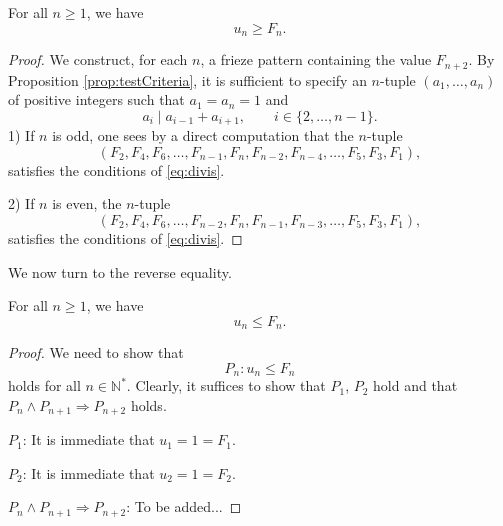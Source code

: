 \begin{lemma}
    \label{l:unLB}
    For all $n \geq 1$, we have 
    \[
        u_n \geq F_{n}.
    \]
\end{lemma}
\begin{proof}
    We construct, for each $n$, a frieze pattern containing the value $F_{n+2}$. By Proposition \ref{prop:testCriteria}, 
    it is sufficient to specify an $n$-tuple $(a_1, \ldots, a_n)$ of positive integers such that $a_1 = a_n =1$ and 
    \begin{equation}\label{eq:divis}
        a_i \mid a_{i-1} + a_{i+1}, \qquad i \in \{2, \ldots, n-1\}.
    \end{equation}
    1) If $n$ is odd, one sees by a direct computation that the $n$-tuple 
    \[
        (F_2,F_4, F_6, \ldots, F_{n-1}, F_{n}, F_{n-2}, F_{n-4}, \ldots, F_5, F_3, F_1), 
    \]
    satisfies the conditions of \eqref{eq:divis}. 

    2) If $n$ is even, the $n$-tuple 
    \[
        (F_2, F_4, F_6, \ldots, F_{n-2}, F_{n}, F_{n-1}, F_{n-3}, \ldots, F_5, F_3,F_1),
    \]
    satisfies the conditions of \eqref{eq:divis}. 
\end{proof}

We now turn to the reverse equality.
\begin{proposition}
    \label{l:unUB}
    For all $n \geq 1$, we have 
    \[
        u_n \leq F_{n}.
    \]
\end{proposition}
\begin{proof}
    We need to show that
    \[
        P_n : u_n \leq F_{n}
    \]
    holds for all $n \in \mathbb{N}^*$. Clearly, it suffices to show that $P_1$, $P_2$ hold and that $P_n \wedge P_{n+1} \Rightarrow P_{n+2}$
    holds. 
    
    $P_1$: It is immediate that $u_1 = 1 = F_1$. 

    $P_2$: It is immediate that $u_2 = 1 = F_2$.  

    $P_n \wedge P_{n+1} \Rightarrow P_{n+2}$: To be added...
\end{proof}